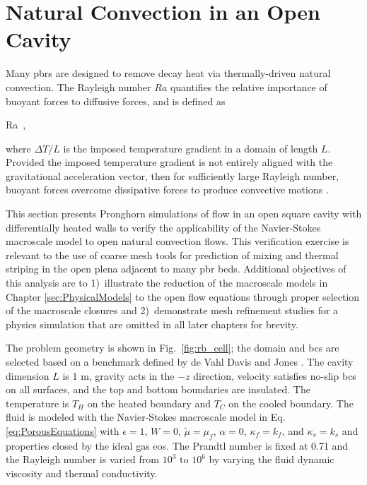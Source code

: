 \section{Natural Convection in an Open Cavity}
\label{sec:natural_convection}

Many \glspl{pbr} are designed to remove decay heat via thermally-driven natural convection. The Rayleigh number \(Ra\) quantifies the relative importance of buoyant forces to diffusive forces, and is defined as

\beq
\label{eq:RaDef}
Ra\equiv{}\ ,
\eeq

\noindent where \(\Delta T/L\) is the imposed temperature gradient in a domain of length \(L\). Provided the imposed temperature gradient is not entirely aligned with the gravitational acceleration vector, then for sufficiently large Rayleigh number, buoyant forces overcome dissipative forces to produce convective motions \cite{manneville,sandberg}.

This section presents Pronghorn simulations of flow in an open square cavity with differentially heated walls to verify the applicability of the Navier-Stokes macroscale model to open natural convection flows. This verification exercise is relevant to the use of coarse mesh tools for prediction of mixing and thermal striping in the open plena adjacent to many \gls{pbr} beds. Additional objectives of this analysis are to 1)~illustrate the reduction of the macroscale models in Chapter \ref{sec:PhysicalModels} to the open flow equations through proper selection of the macroscale closures and 2)~demonstrate mesh refinement studies for a physics simulation that are omitted in all later chapters for brevity.

The problem geometry is shown in Fig.\ \ref{fig:rb_cell}; the domain and \glspl{bc} are selected based on a benchmark defined by de Vahl Davis and Jones \cite{davis}. The cavity dimension \(L\) is 1 \si{\meter}, gravity acts in the \(-z\) direction, velocity satisfies no-slip \glspl{bc} on all surfaces, and the top and bottom boundaries are insulated. The temperature is \(T_H\) on the heated boundary and \(T_C\) on the cooled boundary. The fluid is modeled with the Navier-Stokes macroscale model in Eq. \eqref{eq:PorousEquations} with \(\epsilon=1\), \(W=0\), \(\tilde{\mu}=\mu_f\), \(\alpha=0\), \(\kappa_f=k_f\), and \(\kappa_s=k_s\) and properties closed by the ideal gas \gls{eos}. The Prandtl number is fixed at 0.71 and the Rayleigh number is varied from \(10^3\) to \(10^6\) by varying the fluid dynamic viscosity and thermal conductivity.

